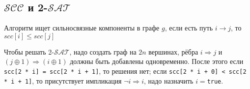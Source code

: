 \subsection{$\mathcal{SCC}$ и 2-$\mathcal{SAT}$}
Алгоритм ищет сильносвязные компоненты в графе $g$, если есть путь $i \rightarrow j$, то $scc[i] \le scc[j]$


Чтобы решать 2-$\mathcal{SAT}$, надо создать граф на $2n$ вершинах, рёбра $i \Rightarrow j$ и $(j\oplus1) \Rightarrow (i \oplus 1)$ должны быть добавлены одновременно.
После этого если \texttt{scc[2 * i] = scc[2 * i + 1]}, то решения нет; если \texttt{scc[2 * i + 0] < scc[2 * i + 1]}, то присутствует импликация $\neg i \Rightarrow i$, надо назначить $i = $\texttt{true}.

